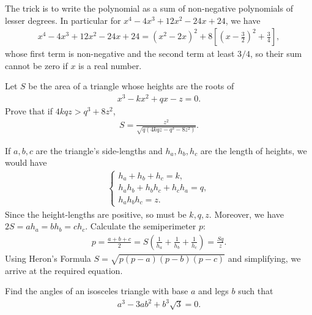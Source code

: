 \documentclass[12pt,a4paper]{memoir}
\theoremstyle{definition}
\begin{document}
\begin{solution}
	The trick is to write the polynomial as a sum of non-negative polynomials of lesser degrees. In particular for $x^4-4x^3+12x^2-24x+24$, we have
	\begin{align*}
		x^4-4x^3+12x^2-24x+24 = (x^2-2x)^2 + 8\left[\left(x-\frac{3}{2}\right)^2+\frac{3}{4}\right],
	\end{align*}
	whose first term is non-negative and the second term at least $3/4$, so their sum cannot be zero if $x$ is a real number.
\end{solution}


\begin{question}
	Let $S$ be the area of a triangle whose heights are the roots of
	\begin{align*}
		x^3-kx^2+qx-z=0.
	\end{align*}
	Prove that if $4kqz > q^3 + 8z^2$,
	\begin{align*}
		S=\frac{z^2}{\sqrt{q(4kqz-q^3-8z^2)}}.
	\end{align*}
\end{question}


\begin{solution}
	If $a,b,c$ are the triangle's side-lengths and $h_a,h_b,h_c$ are the length of heights, we would have
	\begin{align*}
		\begin{cases}
			h_a + h_b + h_c = k,\\
			h_ah_b + h_bh_c + h_ch_a = q,\\
			h_ah_bh_c = z.
		\end{cases}
	\end{align*}
	Since the height-lengths are positive, so must be $k,q,z$. Moreover, we have $2S = ah_a=bh_b=ch_c$. Calculate the semiperimeter $p$:
	\begin{align*}
		p = \frac{a+b+c}{2} = S\left(\frac{1}{h_a}+\frac{1}{h_b}+\frac{1}{h_c}\right) = \frac{Sq}{z}.
	\end{align*}
	Using Heron's Formula $S=\sqrt{p(p-a)(p-b)(p-c)}$ and simplifying, we arrive at the required equation.
\end{solution}


\begin{question}
	Find the angles of an isosceles triangle with base $a$ and legs $b$ such that
	\begin{align*}
		a^3-3ab^2+b^3\sqrt{3}=0.
	\end{align*}
\end{question}
\end{document}
